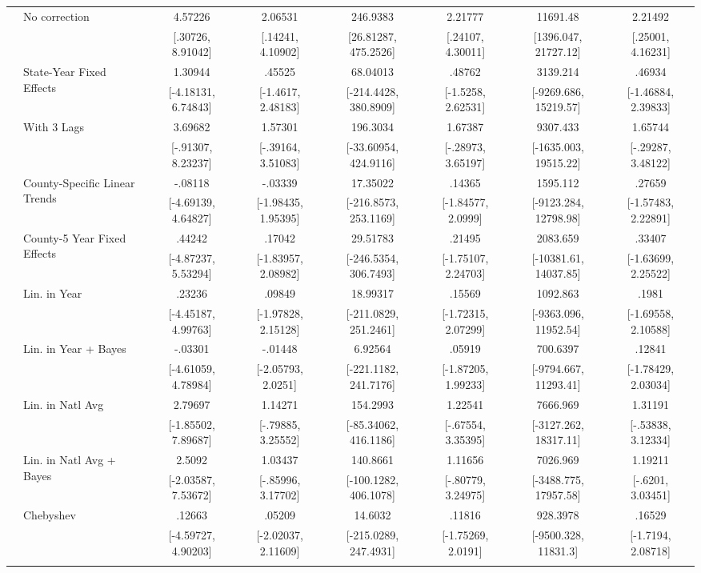 \begin{landscape}
\begin{table}[htb]
\begin{threeparttable}
{\begin{tabular}{llcccccc}
  & \multirow{2}{*}{No correction} & 4.57226 & 2.06531 & 246.9383 & 2.21777 & 11691.48 & 2.21492 \\  & & [.30726, 8.91042] & [.14241, 4.10902] & [26.81287, 475.2526] & [.24107, 4.30011] & [1396.047, 21727.12] & [.25001, 4.16231] \\  & \multirow{2}{*}{State-Year Fixed Effects} & 1.30944 & .45525 & 68.04013 & .48762 & 3139.214 & .46934 \\  & & [-4.18131, 6.74843] & [-1.4617, 2.48183] & [-214.4428, 380.8909] & [-1.5258, 2.62531] & [-9269.686, 15219.57] & [-1.46884, 2.39833] \\  & \multirow{2}{*}{With 3 Lags} & 3.69682 & 1.57301 & 196.3034 & 1.67387 & 9307.433 & 1.65744 \\  & & [-.91307, 8.23237] & [-.39164, 3.51083] & [-33.60954, 424.9116] & [-.28973, 3.65197] & [-1635.003, 19515.22] & [-.29287, 3.48122] \\  & \multirow{2}{*}{County-Specific Linear Trends} & -.08118 & -.03339 & 17.35022 & .14365 & 1595.112 & .27659 \\  & & [-4.69139, 4.64827] & [-1.98435, 1.95395] & [-216.8573, 253.1169] & [-1.84577, 2.0999] & [-9123.284, 12798.98] & [-1.57483, 2.22891] \\  & \multirow{2}{*}{County-5 Year Fixed Effects} & .44242 & .17042 & 29.51783 & .21495 & 2083.659 & .33407 \\  & & [-4.87237, 5.53294] & [-1.83957, 2.08982] & [-246.5354, 306.7493] & [-1.75107, 2.24703] & [-10381.61, 14037.85] & [-1.63699, 2.25522] \\  & \multirow{2}{*}{Lin. in Year} & .23236 & .09849 & 18.99317 & .15569 & 1092.863 & .1981 \\  & & [-4.45187, 4.99763] & [-1.97828, 2.15128] & [-211.0829, 251.2461] & [-1.72315, 2.07299] & [-9363.096, 11952.54] & [-1.69558, 2.10588] \\  & \multirow{2}{*}{Lin. in Year + Bayes} & -.03301 & -.01448 & 6.92564 & .05919 & 700.6397 & .12841 \\  & & [-4.61059, 4.78984] & [-2.05793, 2.0251] & [-221.1182, 241.7176] & [-1.87205, 1.99233] & [-9794.667, 11293.41] & [-1.78429, 2.03034] \\  & \multirow{2}{*}{Lin. in Natl Avg} & 2.79697 & 1.14271 & 154.2993 & 1.22541 & 7666.969 & 1.31191 \\  & & [-1.85502, 7.89687] & [-.79885, 3.25552] & [-85.34062, 416.1186] & [-.67554, 3.35395] & [-3127.262, 18317.11] & [-.53838, 3.12334] \\  & \multirow{2}{*}{Lin. in Natl Avg + Bayes} & 2.5092 & 1.03437 & 140.8661 & 1.11656 & 7026.969 & 1.19211 \\  & & [-2.03587, 7.53672] & [-.85996, 3.17702] & [-100.1282, 406.1078] & [-.80779, 3.24975] & [-3488.775, 17957.58] & [-.6201, 3.03451] \\  & \multirow{2}{*}{Chebyshev} & .12663 & .05209 & 14.6032 & .11816 & 928.3978 & .16529 \\  & & [-4.59727, 4.90203] & [-2.02037, 2.11609] & [-215.0289, 247.4931] & [-1.75269, 2.0191] & [-9500.328, 11831.3] & [-1.7194, 2.08718] \\  & 
\end{tabular}}
\end{threeparttable}
\end{table}
\end{landscape}
